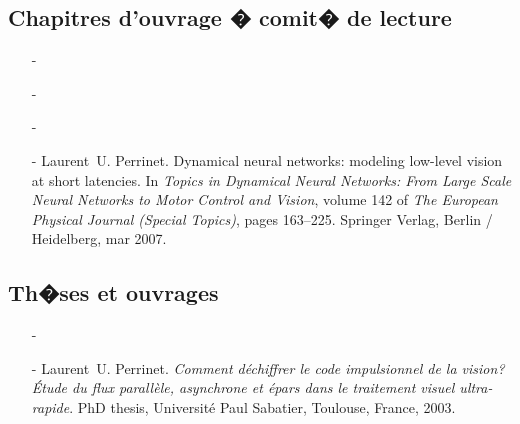 \documentclass[11pt,french,a4paper,oneside]{article}%
\begin{document}
\subsection{Chapitres d'ouvrage � comit� de lecture}%
\begin{enumerate}
%
\item[-] 

\item[-] 

\item[-] 


\item[-] %
Laurent~U. Perrinet.
\newblock Dynamical neural networks: modeling low-level vision at short
  latencies.
\newblock In \emph{Topics in Dynamical Neural Networks: From Large Scale Neural
  Networks to Motor Control and Vision}, volume 142 of \emph{The European
  Physical Journal (Special Topics)}, pages 163--225. Springer Verlag, Berlin /
  Heidelberg, mar 2007.

 \end{enumerate}

\subsection{Th�ses et ouvrages}%

\begin{enumerate}

\item[-] 

\item[-] %
Laurent~U. Perrinet.
\newblock \emph{Comment d{\'e}chiffrer le code impulsionnel de la vision?
  {\'{E}}tude du flux parall{\`e}le, asynchrone et {\'e}pars dans le traitement
  visuel ultra-rapide}.
\newblock PhD thesis, Universit{\'e} Paul Sabatier, Toulouse, France, 2003.
 \end{enumerate}
\end{document}
